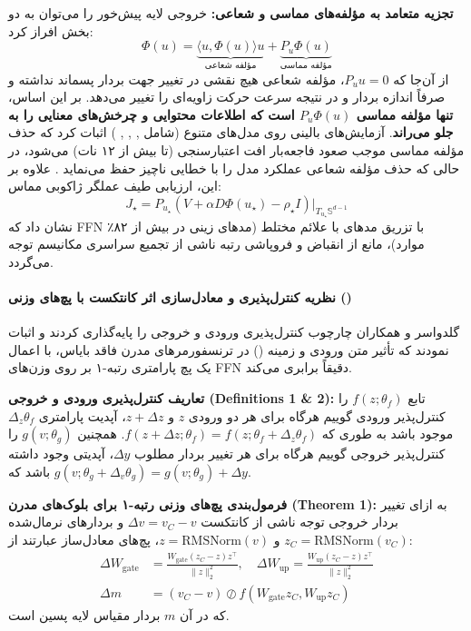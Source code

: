 \textbf{تجزیه متعامد به مؤلفه‌های مماسی و شعاعی:}
خروجی لایه پیش‌خور را می‌توان به دو بخش افراز کرد:
\begin{equation}
    \Phi(u) = \underbrace{\langle u, \Phi(u) \rangle u}_{\text{مؤلفه شعاعی}} + \underbrace{P_u \Phi(u)}_{\text{مؤلفه مماسی}}
\end{equation}
از آن‌جا که $P_u u = 0$، مؤلفه شعاعی هیچ نقشی در تغییر جهت بردار پسماند نداشته و صرفاً اندازه بردار و در نتیجه سرعت حرکت زاویه‌ای را تغییر می‌دهد. بر این اساس، \textbf{تنها مؤلفه مماسی $P_u \Phi(u)$ است که اطلاعات محتوایی و چرخش‌های معنایی را به جلو می‌راند}. آزمایش‌های بالینی روی مدل‌های متنوع (شامل , , , ) اثبات کرد که حذف مؤلفه مماسی موجب صعود فاجعه‌بار افت اعتبارسنجی (تا بیش از ۱۲ نات) می‌شود، در حالی که حذف مؤلفه شعاعی عملکرد مدل را با خطایی ناچیز حفظ می‌نماید \cite{mudarisov2026feedforward}. علاوه بر این، ارزیابی طیف عملگر ژاکوبی مماس:
\begin{equation}
    J_\star = P_{u_\star} \left( V + \alpha D\Phi(u_\star) - \rho_\star I \right) \big|_{T_{u_\star} \mathbb{S}^{d-1}}
\end{equation}
نشان داد که FFN با تزریق مدهای با علائم مختلط (مدهای زینی در بیش از ۸۲٪ موارد)، مانع از انقباض و فروپاشی رتبه ناشی از تجمیع سراسری مکانیسم توجه می‌گردد.

\paragraph*{نظریه کنترل‌پذیری و معادل‌سازی اثر کانتکست با پچ‌های وزنی ()}
گلدواسر و همکاران \cite{goldwaser2026equivalence} چارچوب کنترل‌پذیری ورودی و خروجی را پایه‌گذاری کردند و اثبات نمودند که تأثیر متن ورودی و زمینه () در ترنسفورمرهای مدرن فاقد بایاس، با اعمال یک پچ پارامتری رتبه-۱ بر روی وزن‌های FFN دقیقاً برابری می‌کند.

\textbf{تعاریف کنترل‌پذیری ورودی و خروجی (Definitions 1 \& 2):}
تابع $f(z; \theta_f)$ را کنترل‌پذیر ورودی گوییم هرگاه برای هر دو ورودی $z$ و $z + \Delta z$، آپدیت پارامتری $\Delta_z \theta_f$ موجود باشد به طوری که $f(z + \Delta z; \theta_f) = f(z; \theta_f + \Delta_z \theta_f)$. همچنین $g(v; \theta_g)$ را کنترل‌پذیر خروجی گوییم هرگاه برای هر تغییر بردار مطلوب $\Delta y$، آپدیتی وجود داشته باشد که $g(v; \theta_g + \Delta_v \theta_g) = g(v; \theta_g) + \Delta y$.

\textbf{فرمول‌بندی پچ‌های وزنی رتبه-۱ برای بلوک‌های مدرن (Theorem 1):}
به ازای تغییر بردار خروجی توجه ناشی از کانتکست $\Delta v = v_C - v$ و بردارهای نرمال‌شده $z_C = \text{RMSNorm}(v_C)$ و $z = \text{RMSNorm}(v)$، پچ‌های معادل‌ساز عبارتند از:
\begin{align}
    \Delta W_{\text{gate}} &= \frac{W_{\text{gate}} (z_C - z) z^\top}{\|z\|_2^2}, \quad \Delta W_{\text{up}} = \frac{W_{\text{up}} (z_C - z) z^\top}{\|z\|_2^2} \\
    \Delta m &= (v_C - v) \oslash f(W_{\text{gate}} z_C, W_{\text{up}} z_C)
\end{align}
که در آن $m$ بردار مقیاس لایه  پسین است. 

